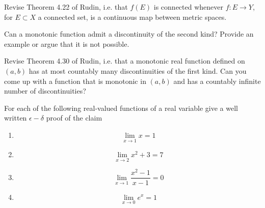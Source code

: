 \documentclass[11pt]{article}%
\begin{document}
\begin{Exercise}[title=**]
	Revise Theorem 4.22 of Rudin, i.e. that $f(E)$ is connected whenever $f:E\to Y$, for $E\subset X$ a connected set, is a continuous map between metric spaces.
\end{Exercise}

\begin{Exercise}[title=*]
	Can a monotonic function admit a discontinuity of the second kind? Provide an example or argue that it is not possible.
\end{Exercise}

\begin{Exercise}[title=**]
	Revise Theorem 4.30 of Rudin, i.e. that a monotonic real function defined on $(a,b)$ has at most countably many discontinuities of the first kind. Can you come up with a function that is monotonic in $(a,b)$ and has a countably infinite number of discontinuities?
\end{Exercise}

\begin{Exercise}[title=**$\dagger$]
For each of the following real-valued functions of a real variable give a well written $\epsilon-\delta$ proof of the claim
\begin{enumerate}
	\item $$\lim_{x\rightarrow 1} x = 1$$
	\item $$\lim_{x\rightarrow 2} x^2+3 = 7$$
	\item $$\lim_{x\rightarrow 1} \frac{x^2-1}{x-1} = 0$$
	\item $$\lim_{x\rightarrow 0} e^x = 1$$
\end{enumerate}

\end{Exercise}
\end{document}
